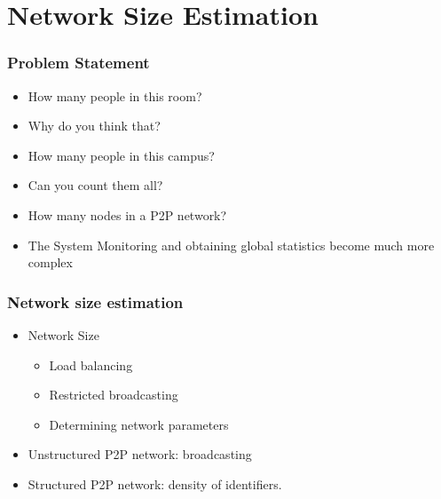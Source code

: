 \documentclass[red]{beamer}
\begin{document}
\fi
\section{Network Size Estimation}

\begin{frame}
\frametitle{Problem Statement}
\begin{itemize}
\item How many people in this room?
\item Why do you think that?
\singlespacing
\item How many people in this campus?
\item Can you count them all?
\singlespacing
\item How many nodes in a P2P network?
\item The System Monitoring and obtaining global statistics
become much more complex
\end{itemize}
\end{frame}


\begin{frame}
\frametitle{Network size estimation}
\begin{itemize}
\item Network Size
\begin{itemize}
\item Load balancing
\item Restricted broadcasting 
\item Determining network parameters
\end{itemize}
\item Unstructured P2P network: broadcasting
\item Structured P2P network: density of identifiers.
\end{itemize}
\end{frame}

\end{document}
